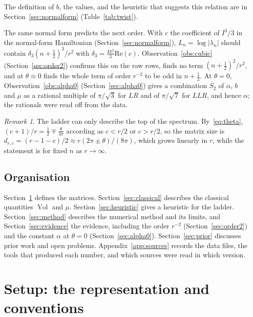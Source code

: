 \documentclass[11pt]{amsart}
\theoremstyle{definition}
\theoremstyle{remark}
\newtheorem{remark}[conjecture]{Remark}
\newcommand{\Vol}{\operatorname{Vol}}
\begin{document}
The definition of $b$, the values, and the heuristic that suggests this relation are in
Section~\ref{sec:normalform} (Table~\ref{tab:twist}).

The same normal form predicts the next order. With $c$ the coefficient of $I^3/3$ in
the normal-form Hamiltonian (Section~\ref{sec:normalform}), $L_n = \log|\lambda_n|$
should contain $\delta_3 (n+\frac12)^3/r^2$ with $\delta_3 = \frac{4\pi^2}{3}
\mathrm{Re}(c)$. Observation~\ref{obs:cubic} (Section~\ref{sec:order2}) confirms this
on the raw rows, finds no term $(n+\frac12)^2/r^2$, and at $\theta \approx 0$ finds the
whole term of order $r^{-2}$ to be odd in $n+\frac12$. At $\theta = 0$,
Observation~\ref{obs:alpha0} (Section~\ref{sec:alpha0}) gives a combination $S_2$ of
$\alpha$, $b$ and $\mu$ as a rational multiple of $\pi/\sqrt3$ for $LR$ and of
$\pi/\sqrt7$ for $LLR$, and hence $\alpha$; the rationals were read off from the data.

\begin{remark}
The ladder can only describe the top of the spectrum. By~\eqref{eq:theta},
$(c+1)/r = \frac12 \mp \frac{\theta}{4\pi}$ according as $c < r/2$ or $c > r/2$, so the
matrix size is $d_{r,c} = (r-1-c)/2 \approx r(2\pi \pm \theta)/(8\pi)$, which grows
linearly in $r$, while the statement is for fixed $n$ as $r \to \infty$.
\end{remark}

\subsection*{Organisation}
Section~\ref{sec:setup} defines the matrices. Section~\ref{sec:classical} describes
the classical quantities $\Vol$ and $\mu$. Section~\ref{sec:heuristic} gives a
heuristic for the ladder. Section~\ref{sec:method} describes the numerical method and
its limits, and Section~\ref{sec:evidence} the evidence, including the order
$r^{-2}$ (Section~\ref{sec:order2}) and the constant $\alpha$ at $\theta = 0$
(Section~\ref{sec:alpha0}). Section~\ref{sec:prior}
discusses prior work and open problems. Appendix~\ref{app:sources} records the data
files, the tools that produced each number, and which sources were read in which
version.

\section{Setup: the representation and conventions}\label{sec:setup}
\end{document}
